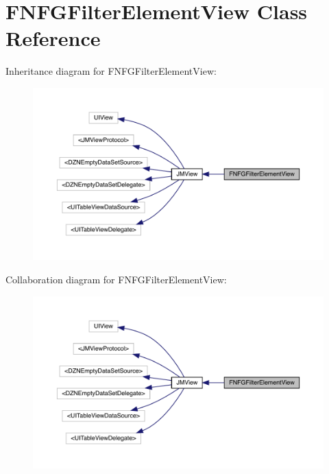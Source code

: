 \hypertarget{interface_f_n_f_g_filter_element_view}{}\section{F\+N\+F\+G\+Filter\+Element\+View Class Reference}
\label{interface_f_n_f_g_filter_element_view}


Inheritance diagram for F\+N\+F\+G\+Filter\+Element\+View\+:\nopagebreak
\begin{figure}[H]
\begin{center}
\leavevmode
\includegraphics[width=350pt]{interface_f_n_f_g_filter_element_view__inherit__graph}
\end{center}
\end{figure}


Collaboration diagram for F\+N\+F\+G\+Filter\+Element\+View\+:\nopagebreak
\begin{figure}[H]
\begin{center}
\leavevmode
\includegraphics[width=350pt]{interface_f_n_f_g_filter_element_view__coll__graph}
\end{center}
\end{figure}
